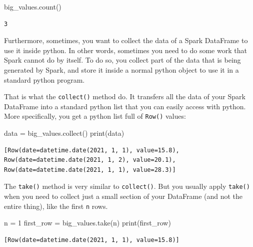 \documentclass[
  11pt,
  letterpaper,
  DIV=11,
  numbers=noendperiod]{scrreprt}
\newenvironment{Shaded}{\begin{snugshade}}{\end{snugshade}}
\newcommand{\BuiltInTok}[1]{\textcolor[rgb]{0.00,0.23,0.31}{#1}}
\newcommand{\DecValTok}[1]{\textcolor[rgb]{0.68,0.00,0.00}{#1}}
\newcommand{\NormalTok}[1]{\textcolor[rgb]{0.00,0.23,0.31}{#1}}
\newcommand{\OperatorTok}[1]{\textcolor[rgb]{0.37,0.37,0.37}{#1}}
\begin{document}
\begin{Shaded}
\begin{Highlighting}[]
\NormalTok{big\_values.count()}
\end{Highlighting}
\end{Shaded}

\begin{verbatim}
3
\end{verbatim}

Furthermore, sometimes, you want to collect the data of a Spark
DataFrame to use it inside python. In other words, sometimes you need to
do some work that Spark cannot do by itself. To do so, you collect part
of the data that is being generated by Spark, and store it inside a
normal python object to use it in a standard python program.

That is what the \texttt{collect()} method do. It transfers all the data
of your Spark DataFrame into a standard python list that you can easily
access with python. More specifically, you get a python list full of
\texttt{Row()} values:

\begin{Shaded}
\begin{Highlighting}[]
\NormalTok{data }\OperatorTok{=}\NormalTok{ big\_values.collect()}
\BuiltInTok{print}\NormalTok{(data)}
\end{Highlighting}
\end{Shaded}

\begin{verbatim}
[Row(date=datetime.date(2021, 1, 1), value=15.8), Row(date=datetime.date(2021, 1, 2), value=20.1), Row(date=datetime.date(2021, 1, 1), value=28.3)]
\end{verbatim}

The \texttt{take()} method is very similar to \texttt{collect()}. But
you usually apply \texttt{take()} when you need to collect just a small
section of your DataFrame (and not the entire thing), like the first
\texttt{n} rows.

\begin{Shaded}
\begin{Highlighting}[]
\NormalTok{n }\OperatorTok{=} \DecValTok{1}
\NormalTok{first\_row }\OperatorTok{=}\NormalTok{ big\_values.take(n)}
\BuiltInTok{print}\NormalTok{(first\_row)}
\end{Highlighting}
\end{Shaded}

\begin{verbatim}
[Row(date=datetime.date(2021, 1, 1), value=15.8)]
\end{verbatim}
\end{document}
